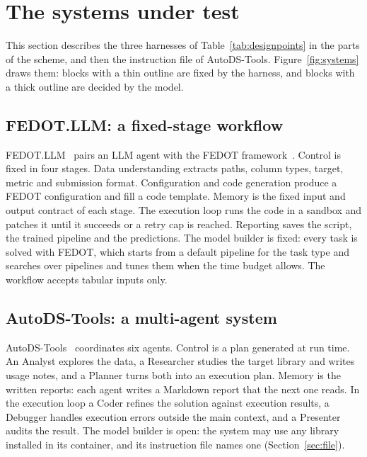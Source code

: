 \section{The systems under test}
\label{sec:systems}



This section describes the three harnesses of Table~\ref{tab:designpoints}
in the parts of the scheme, and then the instruction file of AutoDS-Tools.
Figure~\ref{fig:systems} draws them: blocks with a thin outline are fixed by
the harness, and blocks with a thick outline are decided by the model.

\subsection{FEDOT.LLM: a fixed-stage workflow}

FEDOT.LLM~\citep{fedotllm} pairs an LLM agent with the FEDOT
framework~\citep{nikitin2022fedot}. Control is fixed in four stages. Data
understanding extracts paths, column types, target, metric and submission
format. Configuration and code generation produce a FEDOT configuration and
fill a code template. Memory is the fixed input and output contract of each
stage. The execution loop runs the code in a sandbox and patches it until it
succeeds or a retry cap is reached. Reporting saves the script, the trained
pipeline and the predictions. The model builder is fixed: every task is
solved with FEDOT, which starts from a default pipeline for the task type
and searches over pipelines and tunes them when the time budget allows. The
workflow accepts tabular inputs only.

\subsection{AutoDS-Tools: a multi-agent system}

AutoDS-Tools~\citep{autodstools} coordinates six agents. Control is a plan
generated at run time. An Analyst explores the data, a Researcher studies
the target library and writes usage notes, and a Planner turns both into an
execution plan. Memory is the written reports: each agent writes a Markdown
report that the next one reads. In the execution loop a Coder refines the
solution against execution results, a Debugger handles execution errors
outside the main context, and a Presenter audits the result. The model
builder is open: the system may use any library installed in its container,
and its instruction file names one (Section~\ref{sec:file}).

